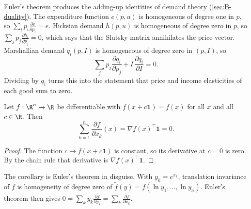 Euler's theorem produces the adding-up identities of demand theory (\cref{sec:B-duality}). The expenditure function
$e(p, u)$ is homogeneous of degree one in $p$, so $\sum_i p_i\frac{\partial e}{\partial p_i} = e$. Hicksian demand
$h(p, u)$ is homogeneous of degree zero in $p$, so $\sum_j p_j\frac{\partial h_i}{\partial p_j} = 0$, which says that the
Slutsky matrix annihilates the price vector. Marshallian demand $q_i(p, I)$ is homogeneous of degree zero in
$(p, I)$, so
\begin{equation*}
\sum_j p_j\frac{\partial q_i}{\partial p_j} + I\,\frac{\partial q_i}{\partial I} = 0 .
\end{equation*}
Dividing by $q_i$ turns this into the statement that price and income elasticities of each good sum to zero.

\begin{corollary}\label{cor:B-translation}
Let $f : \R^n \to \R$ be differentiable with $f(x + c\mathbf{1}) = f(x)$ for all $x$ and all $c \in \R$. Then
\begin{equation*}
\sum_{k = 1}^{n}\frac{\partial f}{\partial x_k}(x) = \nabla f(x)^\top\mathbf{1} = 0 .
\end{equation*}
\end{corollary}

\begin{proof}
The function $c \mapsto f(x + c\mathbf{1})$ is constant, so its derivative at $c = 0$ is zero. By the chain rule
that derivative is $\nabla f(x)^\top\mathbf{1}$.
\end{proof}

The corollary is Euler's theorem in disguise. With $y_k = e^{x_k}$, translation invariance of $f$ is homogeneity of
degree zero of $\tilde f(y) = f(\ln y_1, \dots, \ln y_n)$. Euler's theorem then gives
$0 = \sum_k y_k\frac{\partial \tilde f}{\partial y_k} = \sum_k\frac{\partial f}{\partial x_k}$.

